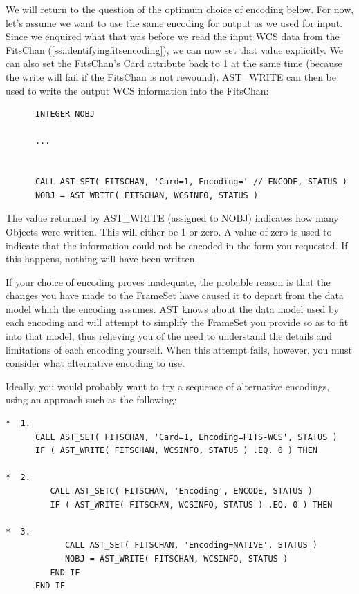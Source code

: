 \documentclass[twoside,11pt]{article}
\newcommand{\htmlref}[2]{#1}
\newcommand{\secref}[1]{\S\ref{#1}}
\renewcommand{\secref}[1]{\ref{#1}}
\begin{document}
We will return to the question of the optimum choice of encoding
below.  For now, let's assume we want to use the same encoding for
output as we used for input. Since we enquired what that was before we
read the input WCS data from the FitsChan
(\secref{ss:identifyingfitsencoding}), we can now set that value
explicitly. We can also set the FitsChan's \htmlref{Card}{Card} attribute back to 1 at
the same time (because the write will fail if the FitsChan is not
rewound). \htmlref{AST\_WRITE}{AST_WRITE} can then be used to write the output WCS
information into the FitsChan:

\small
\begin{verbatim}
      INTEGER NOBJ

      ...


      CALL AST_SET( FITSCHAN, 'Card=1, Encoding=' // ENCODE, STATUS )
      NOBJ = AST_WRITE( FITSCHAN, WCSINFO, STATUS )
\end{verbatim}
\normalsize

The value returned by AST\_WRITE (assigned to NOBJ) indicates how many
Objects were written. This will either be 1 or zero. A value of zero
is used to indicate that the information could not be encoded in the
form you requested. If this happens, nothing will have been written.

If your choice of encoding proves inadequate, the probable reason is
that the changes you have made to the FrameSet have caused it to
depart from the data model which the encoding assumes.  AST knows
about the data model used by each encoding and will attempt to
simplify the FrameSet you provide so as to fit into that model, thus
relieving you of the need to understand the details and limitations of
each encoding yourself. When this attempt fails, however, you must
consider what alternative encoding to use.

Ideally, you would probably want to try a sequence of alternative
encodings, using an approach such as the following:

\small
\begin{verbatim}
*  1.
      CALL AST_SET( FITSCHAN, 'Card=1, Encoding=FITS-WCS', STATUS )
      IF ( AST_WRITE( FITSCHAN, WCSINFO, STATUS ) .EQ. 0 ) THEN

*  2.
         CALL AST_SETC( FITSCHAN, 'Encoding', ENCODE, STATUS )
         IF ( AST_WRITE( FITSCHAN, WCSINFO, STATUS ) .EQ. 0 ) THEN

*  3.
            CALL AST_SET( FITSCHAN, 'Encoding=NATIVE', STATUS )
            NOBJ = AST_WRITE( FITSCHAN, WCSINFO, STATUS )
         END IF
      END IF
\end{verbatim}
\normalsize
\end{document}
